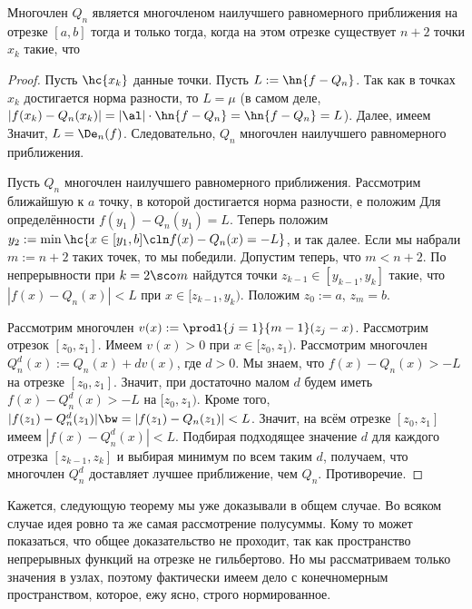 \documentclass[a4paper]{article}
\begin{document}
\begin{theorem}[Чебышёв]
Многочлен $Q_n$ является многочленом наилучшего равномерного
приближения на отрезке $[a,b]$ тогда и только тогда, когда на этом
отрезке существует $n+2$ точки $x_k$ такие, что 
\end{theorem}
\begin{proof}

\framebox{$\Lar$} Пусть $\hc{x_k}$ данные точки. Пусть $L :=
\hn{f-Q_n}$. Так как в точках $x_k$ достигается норма разности, то $L
= \mu$ (в самом деле, $|f(x_k) -Q_n(x_k)| = |\al| \cdot \hn{f-Q_n} =
\hn{f-Q_n} = L$).  Далее, имеем   Значит, $L = \De_n(f)$. Следовательно, $Q_n$
многочлен наилучшего равномерного приближения.

\framebox{$\Ra$} Пусть $Q_n$ многочлен наилучшего равномерного
приближения. Рассмотрим ближайшую к $a$ точку, в которой достигается
норма разности, е положим  Для определённости $f(y_1)-Q_n(y_1) =
L$. Теперь положим $y_2 := \min\hc{x\in [y_1,b]\cln f(x)-Q_n(x) =-L}$,
и так далее. Если мы набрали $m := n+2$ таких точек, то мы победили.
Допустим теперь, что $m < n+2$. По непрерывности при $k=2\sco m$
найдутся точки $z_{k-1} \in [y_{k-1},y_k]$ такие, что $|f(x)-Q_n(x)| <
L$ при $x\in [z_{k-1},y_k)$. Положим $z_0 := a$, $z_m = b$.

Рассмотрим многочлен $v(x) := \prodl{j=1}{m-1}(z_j-x)$. Рассмотрим
отрезок $[z_0,z_1]$. Имеем $v(x) > 0$ при $x\in [z_0,z_1)$.
  Рассмотрим многочлен $Q_n^d(x) := Q_n(x)+d v(x)$, где $d > 0$. Мы
  знаем, что $f(x)-Q_n(x) > -L$ на отрезке $[z_0,z_1]$.  Значит, при
  достаточно малом $d$ будем иметь $f(x)-Q_n^d(x) > -L$ на
  $[z_0,z_1)$. Кроме того, $|f(z_1)-Q_n^d(z_1)| \bw= |f(z_1)-Q_n(z_1)|
    <L$. Значит, на всём отрезке $[z_0,z_1]$ имеем $|f(x)-Q_n^d(x)| <
    L$.  Подбирая подходящее значение $d$ для каждого отрезка
    $[z_{k-1},z_k]$ и выбирая минимум по всем таким $d$, получаем, что
    многочлен $Q_n^d$ доставляет лучшее приближение, чем
    $Q_n$. Противоречие.
\end{proof}

\begin{petit}
Кажется, следующую теорему мы уже доказывали в общем случае. Во всяком
случае идея ровно та же самая рассмотрение полусуммы.  Кому то может
показаться, что общее доказательство не проходит, так как пространство
непрерывных функций на отрезке не гильбертово.  Но мы рассматриваем
только значения в узлах, поэтому фактически имеем дело с конечномерным
пространством, которое, ежу ясно, строго нормированное.
\end{petit}
\end{document}
